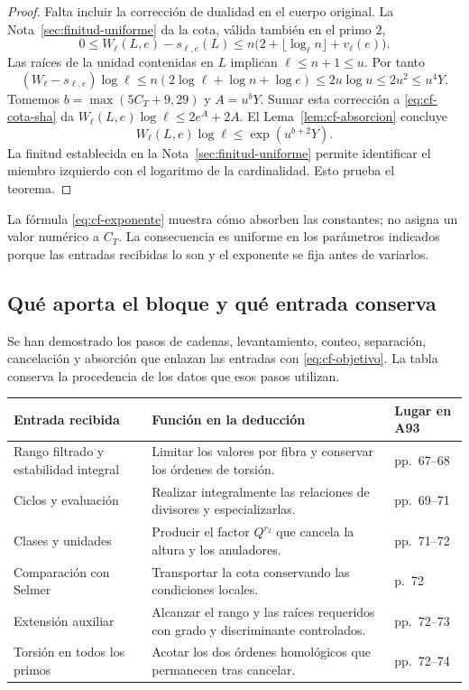 \begin{proof}
Falta incluir la corrección de dualidad en el cuerpo original.
La Nota~\ref{sec:finitud-uniforme} da la cota, válida también
en el primo $2$,
\[
 0\le W_\ell(L,e)-s_{\ell,e}(L)
 \le n\bigl(2+\lfloor\log_\ell n\rfloor+v_\ell(e)\bigr).
\]
Las raíces de la unidad contenidas en $L$ implican
$\ell\le n+1\le u$. Por tanto
\[
 (W_\ell-s_{\ell,e})\log\ell
 \le n(2\log\ell+\log n+\log e)
 \le2u\log u\le2u^2\le u^4Y.
\]
Tomemos $b=\max(5C_T+9,29)$ y $A=u^bY$.
Sumar esta corrección a \eqref{eq:cf-cota-sha} da
$W_\ell(L,e)\log\ell\le2e^A+2A$.
El Lema~\ref{lem:cf-absorcion} concluye
\[
 W_\ell(L,e)\log\ell
 \le\exp(u^{b+2}Y).
\]
La finitud establecida en la Nota~\ref{sec:finitud-uniforme}
permite identificar el miembro izquierdo con el logaritmo
de la cardinalidad. Esto prueba el teorema.
\end{proof}

La fórmula \eqref{eq:cf-exponente} muestra cómo absorben las
constantes; no asigna un valor numérico a $C_T$. La consecuencia
es uniforme en los parámetros indicados porque las entradas
recibidas lo son y el exponente se fija antes de variarlos.

\subsection{Qué aporta el bloque y qué entrada conserva}

Se han demostrado los pasos de cadenas, levantamiento,
conteo, separación, cancelación y absorción que enlazan las
entradas con \eqref{eq:cf-objetivo}. La tabla conserva la
procedencia de los datos que esos pasos utilizan.

\begin{center}
\small
\begin{tabularx}{\textwidth}{@{}p{}Yp{0.18\textwidth}@{}}
\toprule
Entrada recibida & Función en la deducción & Lugar en A93\\
\midrule
Rango filtrado y estabilidad integral
& Limitar los valores por fibra y conservar los órdenes de torsión.
& pp.~67--68\\
Ciclos y evaluación
& Realizar integralmente las relaciones de divisores y especializarlas.
& pp.~69--71\\
Clases y unidades
& Producir el factor $Q^{r_2}$ que cancela la altura y los anuladores.
& pp.~71--72\\
Comparación con Selmer
& Transportar la cota conservando las condiciones locales.
& p.~72\\
Extensión auxiliar
& Alcanzar el rango y las raíces requeridos con grado y discriminante controlados.
& pp.~72--73\\
Torsión en todos los primos
& Acotar los dos órdenes homológicos que permanecen tras cancelar.
& pp.~72--74\\
\bottomrule
\end{tabularx}
\end{center}

